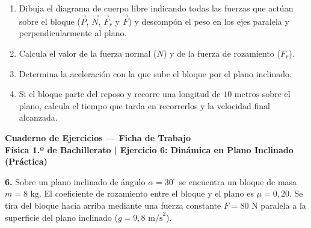 \documentclass[11pt,a4paper]{article}
\begin{document}
\begin{enumerate}[label=\textbf{\alph*)}, leftmargin=2em, itemsep=7pt]
    \item Dibuja el diagrama de cuerpo libre indicando todas las fuerzas que actúan sobre el bloque ($\vec{P}$, $\vec{N}$, $\vec{F}_r$ y $\vec{F}$) y descompón el peso en los ejes paralela y perpendicularmente al plano.
    \item Calcula el valor de la fuerza normal ($N$) y de la fuerza de rozamiento ($F_r$).
    \item Determina la aceleración con la que sube el bloque por el plano inclinado.
    \item Si el bloque parte del reposo y recorre una longitud de $10\text{ metros}$ sobre el plano, calcula el tiempo que tarda en recorrerlos y la velocidad final alcanzada.
\end{enumerate}

\newpage

\begin{center}
    {\LARGE \textbf{Cuaderno de Ejercicios — Ficha de Trabajo}}\\[4pt]
    {\large \textbf{Física 1.º de Bachillerato | Ejercicio 6: Dinámica en Plano Inclinado (Práctica)}}
\end{center}

\vspace{0.3cm}
\noindent\textbf{6.} Sobre un plano inclinado de ángulo $\alpha = 30^\circ$ se encuentra un bloque de masa $m = 8\text{ kg}$. El coeficiente de rozamiento entre el bloque y el plano es $\mu = 0{,}20$. Se tira del bloque hacia arriba mediante una fuerza constante $F = 80\text{ N}$ paralela a la superficie del plano inclinado ($g = 9{,}8\text{ m/s}^2$).

\begin{center}
\end{center}
\end{document}
